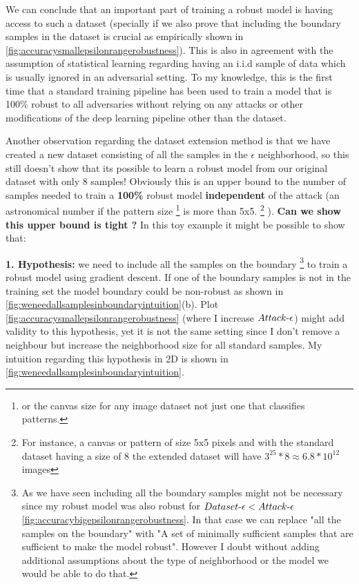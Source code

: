 \documentclass[../thesis.tex]{subfiles}
\begin{document}
	We can conclude that an important part of training a robust model is having access to such a dataset (specially if we also prove that including the boundary samples in the dataset is crucial as empirically shown in \ref{fig:accuracysmallepsilonrangerobustness}). This is also in agreement with the assumption of statistical learning regarding having an i.i.d sample of data which is usually ignored in an adversarial setting. To my knowledge, this is the first time that a standard training pipeline has been used to train a model that is 100\% robust to all adversaries without relying on any attacks or other modifications of the deep learning pipeline other than the dataset.  
	
	
	Another observation regarding the dataset extension method is that we have created a new dataset consisting of all the samples in the $\epsilon$ neighborhood, so this still doesn't show that its possible to learn a robust model from our original dataset with only 8 samples! Obviously this is an upper bound to the number of samples needed to train a \textbf{100\%} robust model \textbf{independent} of the attack (an astronomical number if the pattern size \footnote{or the canvas size for any image dataset not just one that classifies patterns.} is more than 5x5. \footnote{For instance, a canvas or pattern of size 5x5 pixels and with the standard dataset having a size of 8 the extended dataset will have $3^{25} * 8 \approx 6.8*10^{12} $ images} ). \textbf{Can we show this upper bound is tight ?} In this toy example it might be possible to show that:
	
	\textbf{1. Hypothesis:} we need to include all the samples on the boundary 
	\footnote{As we have seen including all the boundary samples might not be necessary since my robust model was also robust for $Dataset\text{-}\epsilon < Attack\text{-}\epsilon$ \ref{fig:accuracybigepsilonrangerobustness}. In that case we can replace "all the samples on the boundary" with "A set of minimally sufficient samples that are sufficient to make the model robust". However I doubt without adding additional assumptions about the type of neighborhood or the model we would be able to do that.} 
	to train a robust model using gradient descent. If one of the boundary samples is not in the training set the model boundary could be non-robust as shown in \ref{fig:weneedallsamplesinboundaryintuition}(b). Plot \ref{fig:accuracysmallepsilonrangerobustness} (where I increase $Attack\text{-}\epsilon$) might add validity to this hypothesis, yet it is not the same setting since I don't remove a neighbour but increase the neighborhood size for all standard samples. My intuition regarding this hypothesis in 2D is shown in \ref{fig:weneedallsamplesinboundaryintuition}.
	
\end{document}
